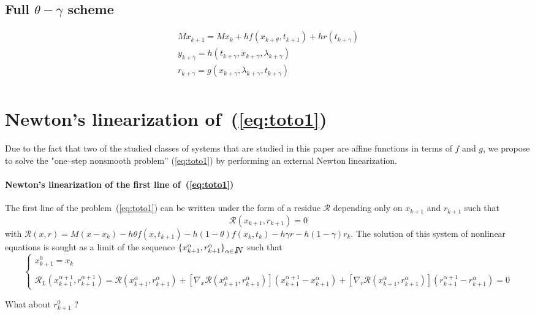 \subsection{Full $\theta-\gamma$ scheme}

  \begin{equation}
    \begin{array}{l}
      \label{eq:toto1-ter}
      M x_{k+1} = M x_{k} +h f(x_{k+\theta},t_{k+1}) + h r(t_{k+\gamma}) \\[2mm]
      y_{k+\gamma} =  h(t_{k+\gamma},x_{k+\gamma},\lambda _{k+\gamma}) \\[2mm]
      r_{k+\gamma} = g(x_{k+\gamma},\lambda_{k+\gamma},t_{k+\gamma})\\[2mm]
    \end{array}
\end{equation}

\clearpage
\section{Newton's linearization of~(\ref{eq:toto1})} 

Due to the fact that  two of the  studied classes of systems that are studied in this paper are affine functions in terms of $f$ and $g$, we propose to solve the "one--step nonsmooth problem'' (\ref{eq:toto1}) by performing an external Newton linearization.

 \paragraph{Newton's linearization of the first line of~(\ref{eq:toto1})} The first line of the  problem~(\ref{eq:toto1}) can be written under the form of a residue $\mathcal R$ depending only on $x_{k+1}$ and $r_{k+1}$ such that 
\begin{equation}
  \label{eq:NL3}
  \mathcal R (x_{k+1},r _{k+1}) =0
\end{equation}
with $\mathcal R(x,r) = M(x - x_{k}) -h\theta f( x , t_{k+1}) - h(1-\theta)f(x_k,t_k) - h\gamma r
- h(1-\gamma)r_k$.
The solution of this system of nonlinear equations is sought as a limit of the sequence $\{ x^{\alpha}_{k+1},r^{\alpha}_{k+1} \}_{\alpha \in \mbox{\rm $I\!\!N$}}$ such that
 \begin{equation}
   \label{eq:NL7}
   \begin{cases}
     x^{0}_{k+1} = x_k \\ \\
     \mathcal R_L( x^{\alpha+1}_{k+1},r^{\alpha+1}_{k+1}) = \mathcal
     R(x^{\alpha}_{k+1},r^{\alpha}_{k+1})  + \left[ \nabla_{x} \mathcal
     R(x^{\alpha}_{k+1},r^{\alpha}_{k+1})\right] (x^{\alpha+1}_{k+1}-x^{\alpha}_{k+1} ) +
     \left[ \nabla_{r} \mathcal R(x^{\alpha}_{k+1},r^{\alpha}_{k+1})\right] (r^{\alpha+1}_{k+1} - r^{\alpha}_{k+1} ) =0
 \end{cases}
\end{equation}
\begin{ndrva}
  What about $r^0_{k+1}$ ?
\end{ndrva}


